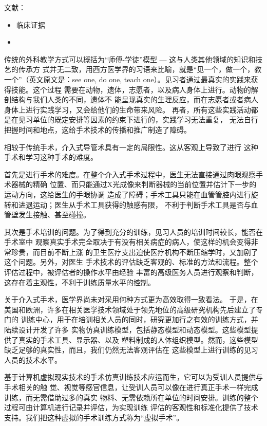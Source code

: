 文献：
\begin{itemize}
  \item 临床证据\cite{Aggarwal2006}
  \item
\end{itemize}

传统的外科教学方式可以概括为“师傅-学徒”模型 --- 这与人类其他领域的知识和技艺的传承方
式并无二致，用西方医学界的习语来比喻，就是“见一个，做一个，教一个”（英文原文是：see
one, do one, teach one）\cite{Dawson1998}。见习者通过最真实的实践来获得技能。这个过程
需要在动物，遗体，志愿者，以及病人身体上进行。动物的解剖结构与我们人类的不同，遗体不
能呈现真实的生理反应，而在志愿者或者病人身体上进行实践学习，又会给他们的生命带来风险\cite{liu2003}。
再者，所有这些实践活动都是在见习单位的既定安排等因素的约束下进行的，实践学习无法重复，
无法自行把握时间和地点，这给手术技术的传播和推广制造了障碍。

相较于传统手术，介入式导管术具有一定的局限性\cite{basdogan2007}。这从客观上导致了进行
这种手术和学习这种手术的难度。

首先是进行手术的难度。在整个介入式手术过程中，医生无法直接通过肉眼观察手术器械的精确
位置、而只能通过X光成像来判断器械的当前位置并估计下一步的运动方向，这给医生的手眼协调
造成了障碍；手术工具只能在血管管腔内进行旋转和进退运动；医生从手术工具获得的触感有限，
不利于判断手术工具是否与血管壁发生接触、甚至碰撞。

其次是手术培训的问题。为了得到充分的训练，见习人员的培训时间较长，能否在手术室中
观察真实手术完全取决于有没有相关病症的病人，使这样的机会变得非常珍贵，而目前不断上涨
的卫生医疗支出迫使医疗机构不断压缩学时，又加剧了这个问题\cite{liu2003}。另外，对医生
手术技术的评估缺乏客观的、标准的方法和流程。整个评估过程中，被评估者的操作水平由经验
丰富的高级医务人员进行观察和判断，这存在着主观性，不利于训练质量水平的控制\cite{basdogan2007}。

关于介入式手术，医学界尚未对采用何种方式更为高效取得一致看法\cite{basdogan2007}。
于是，在美国和欧洲，许多在相关医学技术领域处于领先地位的高级研究机构先后建立了专门的
训练中心，用于在培训相关人员的同时，研究更加行之有效的训练方式，并陆续设计开发了许多
实物仿真训练模型，包括静态模型和动态模型。这些模型提供了真实的手术工具、显示器、以及
塑料制成的人体组织模型。然而，这些模型缺乏足够的真实性，而且，我们仍然无法客观评估在
这些模型上进行训练的见习人员的技术水平。

基于计算机虚拟现实技术的手术仿真训练技术应运而生，它可以为受训人员提供与手术相关的触
觉、视觉等感官信息，让受训人员可以像在进行真正手术一样完成训练，而无需借助过多的真实
物料、无需依赖所在单位的时间安排。训练的整个过程可由计算机进行记录并评估，为实现训练
评估的客观性和标准化提供了技术支持。我们把这种虚拟的手术训练方式称为“虚拟手术”。

